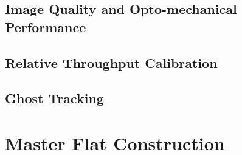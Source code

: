 \subsection{Image Quality and Opto-mechanical Performance}

\subsection{Relative Throughput Calibration}

\subsection{Ghost Tracking}

\section{Master Flat Construction}

